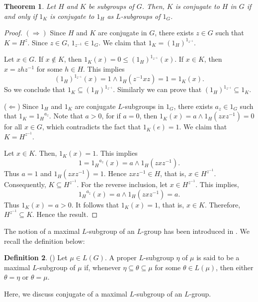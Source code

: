 \documentclass[10pt]{article}
\theoremstyle{plain}
\newtheorem{theorem}{Theorem}[section]
\theoremstyle{definition}
\newtheorem{definition}[theorem]{Definition}
\theoremstyle{remark}
\theoremstyle{case}
\begin{document}
\begin{theorem}
	Let $H$ and $K$ be subgroups of $G$. Then, $K$ is conjugate to $H$ in $G$ if and only if $1_K$ is conjugate to $1_H$ as  $L$-subgroups of $1_G$.
\end{theorem}
\begin{proof}
$(\Rightarrow)$ Since $H$ and $K$ are conjugate in $G$,  there exists $z \in G$ such that $ K = H^z$.
	Since $z \in G$, $1_{z^{-1}} \in 1_G$. We claim that $1_K = ({1_H})^{1_{z^{-1}}}$.
	
	\noindent  Let $x \in G$. If $x \notin K$, then $1_K(x) = 0 \leq ({1_H})^{1_{z^{-1}}}(x)$.
	If $x \in K$, then $x=zhz^{-1}$ for some $h \in H$. This implies \[ ({1_H})^{1_{z^{-1}}}(x) = 1 \wedge 1_H(z^{-1}xz) = 1=1_K(x). \]
	So we conclude that $1_K \subseteq (1_H)^{1_{z^{-1}}}$. Similarly we can prove that $(1_H)^{1_{z^{-1}}} \subseteq 1_K$.
	
\noindent ($\Leftarrow$) Since $1_H$ and $1_K$ are conjugate $L$-subgroups in $1_G$,  there exists $a_z \in 1_G$ such that $1_K = {1_H}^{a_z}$.
	Note that $a > 0$, for if $a=0$, then $1_K(x) = a \wedge 1_H(zxz^{-1}) = 0$ for all $x \in G$, which contradicts the fact that $1_K(e) = 1$.
	\noindent We claim that $K = H^{z^{-1}}$. 
	
	\noindent Let $x \in K$. Then, $1_K(x) = 1$. This implies
	\[ 1 = {1_H}^{a_z}(x) = a \wedge {1_H}(zxz^{-1}). \]
	Thus $a = 1$ and $1_H(zxz^{-1}) = 1$. Hence $zxz^{-1} \in H$, that is, $x \in H^{z^{-1}}$. Consequently, $K \subseteq H^{z^{-1}}$.	For the reverse inclusion, let $x \in H^{z^{-1}}$. This implies,
	\[ {1_H}^{a_z}(x) = a \wedge 1_H(zxz^{-1}) = a. \]
	Thus $1_K(x) = a > 0$. It follows that $1_K(x) = 1$, that is, $x \in K$. Therefore, $ H^{z^{-1}} \subseteq K$. Hence the result.
\end{proof}

\noindent The notion of a maximal $L$-subgroup of an $L$-group has been introduced in \cite{jahan_max}. We recall the definition below: 

\begin{definition}(\cite{jahan_max})
	Let $\mu \in L(G)$. A proper $L$-subgroup $\eta$ of $\mu$ is said to be a maximal $L$-subgroup of $\mu$ if, whenever $\eta \subseteq \theta \subseteq \mu$ for some $\theta \in L(\mu)$, then either $\theta = \eta$ or $\theta = \mu$.
\end{definition}

\noindent Here, we discuss conjugate of a maximal $L$-subgroup of an $L$-group.
\end{document}
